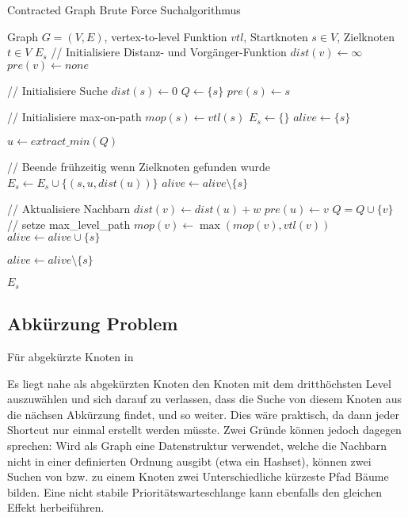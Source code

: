 \begin{algorithm}[ht]
  \caption{Contracted Graph Brute Force Suchalgorithmus}
  \begin{algorithmic}[1]
    \Require Graph $G = (V, E)$, vertex-to-level Funktion ${vtl}$, Startknoten $s \in V$, Zielknoten $t \in V$
    \Ensure $E_s$
    \State // Initialisiere Distanz- und Vorgänger-Funktion
    \State ${dist}(v) \leftarrow \infty$
    \State ${pre}(v) \leftarrow {none}$
    \EndFor

    \State
    \State // Initialisiere Suche
    \State ${dist}(s) \leftarrow 0$
    \State $Q\leftarrow \{ s \}$
    \State ${pre}(s) \leftarrow s$

    \State
    \State // Initialisiere max-on-path
    \State ${mop}(s) \leftarrow {vtl}(s)$
    \State $E_s \leftarrow \{ \}$
    \State ${alive} \leftarrow \{ s \}$

    \State
    \State $u \leftarrow{extract\_min}(Q)$\label{graphs:dijkstra:pop}

    \State
    \State // Beende frühzeitig wenn Zielknoten gefunden wurde
    \State $E_s \leftarrow E_s \cup \{ (s, u, {dist}(u)) \}$
    \State ${alive} \leftarrow {alive} \setminus \{ s \}$
    \EndIf

    \State
    \State // Aktualisiere Nachbarn
    \State ${dist}(v) \leftarrow {dist}(u) + w$
    \State ${pre}(u) \leftarrow v$
    \State $Q = Q \cup \{ v \}$
    \State
    \State // setze max\_level\_path
    \State ${mop}(v) \leftarrow \max({mop}(v), {vtl}(v))$
    \State ${alive} \leftarrow {alive} \cup \{ s \}$
    \EndIf
    \EndIf
    \EndFor

    \State ${alive} \leftarrow {alive} \setminus \{ s \}$

    \EndWhile

    \State
    \State \Return $E_s$
  \end{algorithmic}
\end{algorithm}

\subsection{Abkürzung Problem}

Für abgekürzte Knoten in

Es liegt nahe als abgekürzten Knoten den Knoten mit dem dritthöchsten Level auszuwählen und sich darauf zu verlassen, dass die Suche von diesem Knoten aus die nächsen Abkürzung findet, und so weiter.
Dies wäre praktisch, da dann jeder Shortcut nur einmal erstellt werden müsste.
Zwei Gründe können jedoch dagegen sprechen:
Wird als Graph eine Datenstruktur verwendet, welche die Nachbarn nicht in einer definierten Ordnung ausgibt (etwa ein Hashset), können zwei Suchen von bzw. zu einem Knoten zwei Unterschiedliche kürzeste Pfad Bäume bilden.
Eine nicht stabile Prioritätswarteschlange kann ebenfalls den gleichen Effekt herbeiführen.

